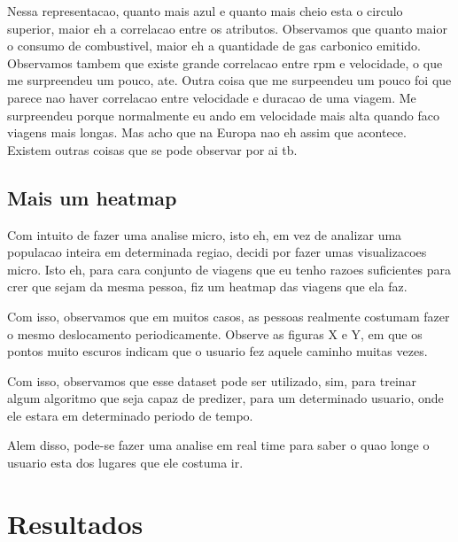 \documentclass[10pt, conference]{IEEEtran}
\begin{document}
Nessa representacao, quanto mais azul e quanto mais cheio esta o circulo superior, maior
eh a correlacao entre os atributos. Observamos que quanto maior o consumo de combustivel,
maior eh a quantidade de gas carbonico emitido. Observamos tambem que existe grande
correlacao entre rpm e velocidade, o que me surpreendeu um pouco, ate. Outra coisa
que me surpeendeu um pouco foi que parece nao haver correlacao entre velocidade e duracao
de uma viagem. Me surpreendeu porque normalmente eu ando em velocidade mais alta quando
faco viagens mais longas. Mas acho que na Europa nao eh assim que acontece. Existem
outras coisas que se pode observar por ai tb.



\subsection{Mais um heatmap}

Com intuito de fazer uma analise micro, isto eh, em vez de analizar uma populacao inteira
em determinada regiao, decidi por fazer umas visualizacoes micro. Isto eh, para cara conjunto
de viagens que eu tenho razoes suficientes para crer que sejam da mesma pessoa, fiz um
heatmap das viagens que ela faz. 

Com isso, observamos que em muitos casos, as pessoas realmente costumam fazer o mesmo deslocamento
periodicamente. Observe as figuras X e Y, em que os pontos muito escuros indicam que o usuario
fez aquele caminho muitas vezes. 

Com isso, observamos que esse dataset pode ser utilizado, sim, para treinar algum algoritmo
que seja capaz de predizer, para um determinado usuario, onde ele estara em determinado periodo 
de tempo.

Alem disso, pode-se fazer uma analise em real time para saber o quao longe o usuario esta dos
lugares que ele costuma ir.






\section{Resultados}
%
\end{document}
